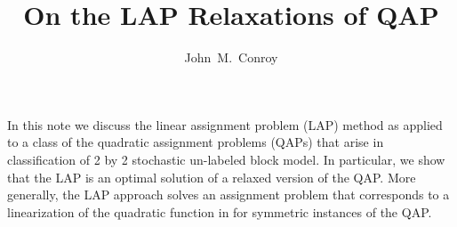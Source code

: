  
%  

\usepackage{amsmath}
\usepackage{amssymb}
\theoremstyle{plain} \newtheorem{Exa}{Example}[section]
\newtheorem{Rem}{Remark}[section]
\newtheorem{Alg}{Algorithm}[section]
\newtheorem{Thm}{Theorem}[section]
\newtheorem{Lem}{Lemma}[section]
\newtheorem{Def}{Definition}[section]
\title{On the LAP Relaxations of QAP}
\author
{John~M.~Conroy}



\maketitle


\renewcommand{\topfraction}{1.0}
\renewcommand{\bottomfraction}{1.0}
\renewcommand{\textfraction}{0.0}

% 
% 



In this note we discuss the linear assignment problem (LAP) 
method  as applied to a class of the quadratic assignment problems (QAPs) that
arise in classification of 2 by 2 stochastic un-labeled block model. 
In particular, we show that the LAP is an optimal solution of a
relaxed version of the QAP.   More generally, the LAP approach
solves an assignment problem that corresponds to a linearization
of the quadratic function in for symmetric instances of the QAP.

